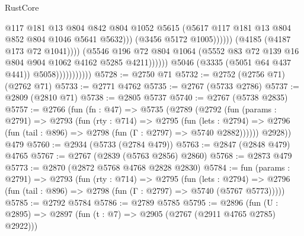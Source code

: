 \begin{lexlean}{RustCore}
\begin{coremodule}
                                                    @117
                                                    @181
                                                    @13
                                                    @804
                                                    @842
                                                    @804
                                                    @1052
                                                    @5615
                                                    (@5617
                                                      @117
                                                      @181
                                                      @13
                                                      @804
                                                      @852
                                                      @804
                                                      @1046
                                                      @5641
                                                      @5632)))
                                                (@3456 @5172 @1005))))))
                                      (@4185 (@4187 @173 @72 @1041))))
                                  (@5546
                                    @196
                                    @72
                                    @804
                                    @1064
                                    (@5552 @83 @72 @139 @16 @804 @904 @1062 @4162 @5285 @4211))))))
                          @5046
                          (@3335 (@5051 @64 @437 @441))
                          @5058)))))))))))
@5728 := @2750 @71
@5732 := @2752 (@2756 @71) (@2762 @71)
@5733 := @2771 @4762
@5735 := @2767 (@5733 @2786)
@5737 := @2809 (@2810 @71)
@5738 := @2805 @5737
@5740 := @2767 (@5738 @2835)
@5757 := @2766
    (fun (fn : @47) =>
    @5735
      (@2789
        (@2792
          (fun (params : @2791) =>
          @2793
            (fun (rty : @714) =>
            @2795
              (fun (lets : @2794) =>
              @2796 (fun (tail : @896) => @2798 (fun (Γ : @2797) => @5740 @2882))))))
        @2928))
    @479
@5760 := @2934 (@5733 (@2784 @479))
@5763 := @2847 (@2848 @479) @4765
@5767 := @2767 (@2839 (@5763 @2856) @2860)
@5768 := @2873 @479
@5773 := @2870 (@2872 @5768 @4768 @2828 @2830)
@5784 := fun (params : @2791) =>
  @2793
    (fun (rty : @714) =>
    @2795
      (fun (lets : @2794) =>
      @2796 (fun (tail : @896) => @2798 (fun (Γ : @2797) => @5740 (@5767 @5773)))))
@5785 := @2792 @5784
@5786 := @2789 @5785
@5795 := @2896 (fun (U : @2895) => @2897 (fun (t : @7) => @2905 (@2767 (@2911 @4765 @2785) @2922)))

\end{coremodule}
\end{lexlean}
